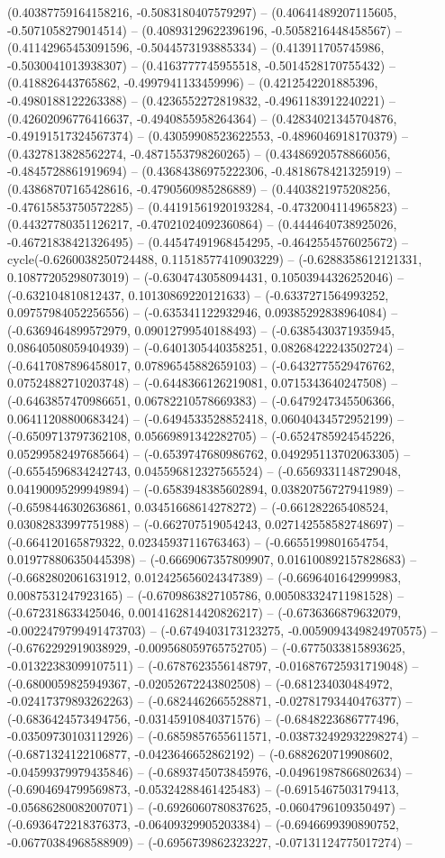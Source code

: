 (0.40387759164158216, -0.5083180407579297) -- (0.40641489207115605, -0.5071058279014514) -- (0.40893129622396196, -0.5058216448458567) -- (0.41142965453091596, -0.5044573193885334) -- (0.413911705745986, -0.5030041013938307) -- (0.4163777745955518, -0.5014528170755432) -- (0.418826443765862, -0.4997941133459996) -- (0.4212542201885396, -0.4980188122263388) -- (0.4236552272819832, -0.4961183912240221) -- (0.42602096776416637, -0.4940855958264364) -- (0.42834021345704876, -0.49191517324567374) -- (0.43059908523622553, -0.4896046918170379) -- (0.4327813828562274, -0.4871553798260265) -- (0.43486920578866056, -0.4845728861919694) -- (0.43684386975222306, -0.4818678421325919) -- (0.43868707165428616, -0.4790560985286889) -- (0.4403821975208256, -0.47615853750572285) -- (0.44191561920193284, -0.4732004114965823) -- (0.44327780351126217, -0.47021024092360864) -- (0.4444640738925026, -0.46721838421326495) -- (0.44547491968454295, -0.4642554576025672) -- cycle(-0.6260038250724488, 0.11518577410903229) -- (-0.6288358612121331, 0.10877205298073019) -- (-0.6304743058094431, 0.10503944326252046) -- (-0.632104810812437, 0.10130869220121633) -- (-0.6337271564993252, 0.09757984052256556) -- (-0.635341122932946, 0.09385292838964084) -- (-0.6369464899572979, 0.09012799540188493) -- (-0.6385430371935945, 0.08640508059404939) -- (-0.6401305440358251, 0.08268422243502724) -- (-0.6417087896458017, 0.07896545882659103) -- (-0.6432775529476762, 0.07524882710203748) -- (-0.6448366126219081, 0.0715343640247508) -- (-0.6463857470986651, 0.06782210578669383) -- (-0.6479247345506366, 0.06411208800683424) -- (-0.6494533528852418, 0.06040434572952199) -- (-0.6509713797362108, 0.05669891342282705) -- (-0.6524785924545226, 0.05299582497685664) -- (-0.6539747680986762, 0.049295113702063305) -- (-0.6554596834242743, 0.045596812327565524) -- (-0.6569331148729048, 0.04190095299949894) -- (-0.6583948385602894, 0.03820756727941989) -- (-0.6598446302636861, 0.03451668614278272) -- (-0.661282265408524, 0.03082833997751988) -- (-0.662707519054243, 0.027142558582748697) -- (-0.664120165879322, 0.02345937116763463) -- (-0.6655199801654754, 0.019778806350445398) -- (-0.6669067357809907, 0.016100892157828683) -- (-0.6682802061631912, 0.012425656024347389) -- (-0.6696401642999983, 0.0087531247923165) -- (-0.6709863827105786, 0.005083324711981528) -- (-0.672318633425046, 0.0014162814420826217) -- (-0.6736366879632079, -0.0022479799491473703) -- (-0.6749403173123275, -0.0059094349824970575) -- (-0.6762292919038929, -0.009568059765752705) -- (-0.6775033815893625, -0.01322383099107511) -- (-0.6787623556148797, -0.016876725931719048) -- (-0.6800059825949367, -0.02052672243802508) -- (-0.681234030484972, -0.02417379893262263) -- (-0.6824462665528871, -0.02781793440476377) -- (-0.6836424573494756, -0.03145910840371576) -- (-0.6848223686777496, -0.03509730103112926) -- (-0.6859857655611571, -0.038732492932298274) -- (-0.6871324122106877, -0.0423646652862192) -- (-0.6882620719908602, -0.04599379979435846) -- (-0.6893745073845976, -0.04961987866802634) -- (-0.6904694799569873, -0.05324288461425483) -- (-0.6915467503179413, -0.05686280082007071) -- (-0.6926060780837625, -0.0604796109350497) -- (-0.6936472218376373, -0.06409329905203384) -- (-0.6946699390890752, -0.06770384968588909) -- (-0.6956739862323227, -0.07131124775017274) -- 